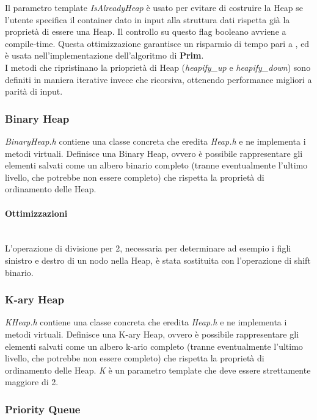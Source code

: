 \noindent Il parametro template \textit{IsAlreadyHeap} è usato per evitare di costruire la Heap se l'utente specifica il container dato in input alla struttura dati rispetta già la proprietà di essere una Heap. Il controllo su questo flag booleano avviene a compile-time. Questa ottimizzazione garantisce un risparmio di tempo pari a \complexityN{}, ed è usata nell'implementazione dell'algoritmo di \textbf{Prim}. \\

\noindent I metodi che ripristinano la prioprietà di Heap (\textit{heapify\_up} e \textit{heapify\_down}) sono definiti in maniera iterative invece che ricorsiva, ottenendo performance migliori a parità di input.

\subsubsection{Binary Heap}

\textit{BinaryHeap.h} contiene una classe concreta che eredita \textit{Heap.h} e ne implementa i metodi virtuali. Definisce una Binary Heap, ovvero è possibile rappresentare gli elementi salvati come un albero binario completo (tranne eventualmente l'ultimo livello, che potrebbe non essere completo) che rispetta la proprietà di ordinamento delle Heap.

\paragraph{Ottimizzazioni}\mbox{} \\

\noindent L'operazione di divisione per 2, necessaria per determinare ad esempio i figli sinistro e destro di un nodo nella Heap, è stata sostituita con l'operazione di shift binario.

\subsubsection{K-ary Heap}

\textit{KHeap.h} contiene una classe concreta che eredita \textit{Heap.h} e ne implementa i metodi virtuali. Definisce una K-ary Heap, ovvero è possibile rappresentare gli elementi salvati come un albero k-ario completo (tranne eventualmente l'ultimo livello, che potrebbe non essere completo) che rispetta la proprietà di ordinamento delle Heap.
\textit{K} è un parametro template che deve essere strettamente maggiore di 2.

\subsubsection{Priority Queue}

